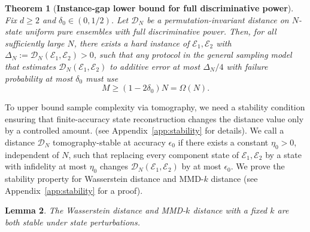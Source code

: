 \documentclass[aps,prx,reprint,superscriptaddress,amsmath,amssymb,longbibliography,floatfix]{revtex4-2}
\newcommand{\scD}{\mathcal{D}}
\newcommand{\scE}{\mathcal{E}}
\theoremstyle{plain}
\newtheorem{theorem}{Theorem}[section]
\newtheorem{lemma}[theorem]{Lemma}
\theoremstyle{definition}
\theoremstyle{remark}
\begin{document}
\begin{theorem}[\textbf{Instance-gap lower bound for full discriminative power}]
\label{thm:lower-bound-full-discriminative}
Fix \(d\ge 2\) and \(\delta_0\in(0,1/2)\). Let \(\scD_N\) be a permutation-invariant
distance on \(N\)-state uniform pure ensembles with full discriminative power. Then, for
all sufficiently large \(N\), there exists a hard instance of $\scE_1, \scE_2$
with $\Delta_N:=\scD_N(\scE_1,\scE_2)>0$, such that any protocol in the general sampling model that estimates $\scD_N(\scE_1,\scE_2)$
to additive error at most
\(\Delta_N/4\) with failure probability at most \(\delta_0\) must use
\[
    M\ge (1-2\delta_0)N=\Omega(N).
\]
\end{theorem}

To upper bound sample complexity via tomography, we need a stability condition ensuring that finite-accuracy state reconstruction changes the distance value only by a controlled amount. (see Appendix~\ref{app:stability} for details).
We call a distance \(\scD_N\) tomography-stable at accuracy \(\epsilon_0\) if there exists
a constant \(\eta_0>0\), independent of \(N\), such that replacing every component state
of \(\scE_1,\scE_2\) by a state with infidelity at most \(\eta_0\) changes
\(\scD_N(\scE_1,\scE_2)\) by at most \(\epsilon_0\).
We prove the stability property for Wasserstein distance and MMD-$k$ distance (see Appendix~\ref{app:stability} for a proof).
\begin{lemma}\label{lemma:stability}
The Wasserstein distance and MMD-$k$ distance with a fixed $k$ are both stable under state perturbations.
\end{lemma}
\end{document}
